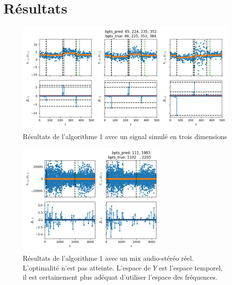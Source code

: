 \documentclass{beamer}
\theoremstyle{definition}
\begin{document}
\section{Résultats}
	\begin{frame}[allowframebreaks]{\insertsection}
		\begin{figure}
			\includegraphics[width=1\textwidth]{algo1simu.png}
			\caption{Résultats de l'algorithme 1 avec un signal simulé en trois dimensions}
			\label{fig:algo1simu}
		\end{figure}
	
		\begin{figure}
			\includegraphics[width=0.67\textwidth]{algo1real.png}
			\caption{Résultats de l'algorithme 1 avec un mix audio-stéréo réel. L'optimalité n'est pas atteinte. L'espace de $Y$ est l'espace temporel, il est certainement plus adéquat d'utiliser l'espace des fréquences.}
			\label{fig:algo1real}
		\end{figure}
	\end{frame}
\end{document}
